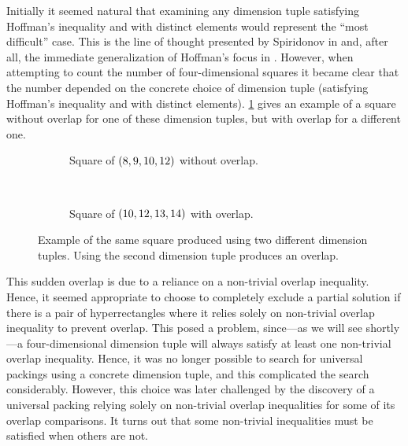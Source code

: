 Initially it seemed natural that examining any dimension tuple satisfying Hoffman's inequality and with distinct elements would represent the ``most difficult'' case. This is the line of thought presented by Spiridonov in \cite[p. 6]{Spiridonov_2003} and, after all, the immediate generalization of Hoffman's focus in \cite[p. 215]{Hoffman1981}. However, when attempting to count the number of four-dimensional squares it became clear that the number depended on the concrete choice of dimension tuple (satisfying Hoffman's inequality and with distinct elements). \cref{fig:4d-squares-good-bad} gives an example of a square without overlap for one of these dimension tuples, but with overlap for a different one.
\begin{figure}[ht]
    \centering
    \begin{subfigure}[b]{0.47\textwidth}
        \centering
            \begin{tikzpicture}[scale=0.12]
                
            \end{tikzpicture}
        \caption{Square of $\paren{8, 9, 10, 12}$ without overlap.}
    \end{subfigure}
    ~
    \begin{subfigure}[b]{0.47\textwidth}
        \centering
            \begin{tikzpicture}[scale=0.12*39/49]
                
            \end{tikzpicture}
        \caption{Square of $\paren{10, 12, 13, 14}$ with overlap.}
    \end{subfigure}
    \caption{Example of the same square produced using two different dimension tuples. Using the second dimension tuple produces an overlap.}
    \label{fig:4d-squares-good-bad}
\end{figure}
This sudden overlap is due to a reliance on a non-trivial overlap inequality. Hence, it seemed appropriate to choose to completely exclude a partial solution if there is a pair of hyperrectangles where it relies solely on non-trivial overlap inequality to prevent overlap. This posed a problem, since---as we will see shortly---a four-dimensional dimension tuple will always satisfy at least one non-trivial overlap inequality. Hence, it was no longer possible to search for universal packings using a concrete dimension tuple, and this complicated the search considerably. However, this choice was later challenged by the discovery of a universal packing relying solely on non-trivial overlap inequalities for some of its overlap comparisons. It turns out that some non-trivial inequalities must be satisfied when others are not.
